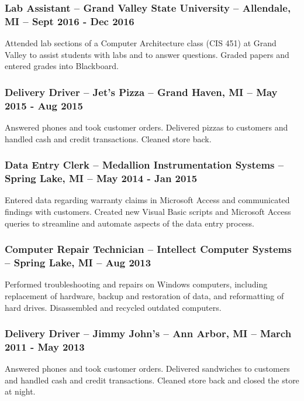 \documentclass{article}
\begin{document}
		\subsubsection{Lab Assistant -- Grand Valley State University -- Allendale, MI -- Sept 2016 - Dec 2016}
			\begin{addmargin}[1em]{0em}
				Attended lab sections of a Computer Architecture class (CIS 451) at Grand Valley to assist students with labs and to answer questions. Graded papers and entered grades into Blackboard.
			\end{addmargin}

		\subsubsection{Delivery Driver -- Jet’s Pizza -- Grand Haven, MI -- May 2015 - Aug 2015}
			\begin{addmargin}[1em]{0em}
				Answered phones and took customer orders. Delivered pizzas to customers and handled cash and credit transactions. Cleaned store back.
			\end{addmargin}

		\subsubsection{Data Entry Clerk -- Medallion Instrumentation Systems -- Spring Lake, MI -- May 2014 - Jan 2015}
			\begin{addmargin}[1em]{0em}
				Entered data regarding warranty claims in Microsoft Access and communicated findings with customers. Created new Visual Basic scripts and Microsoft Access queries to streamline and automate aspects of the data entry process.
			\end{addmargin}

		\subsubsection{Computer Repair Technician -- Intellect Computer Systems -- Spring Lake, MI -- Aug 2013}
			\begin{addmargin}[1em]{0em}
				Performed troubleshooting and repairs on Windows computers, including replacement of hardware, backup and restoration of data, and reformatting of hard drives. Disassembled and recycled outdated computers.
			\end{addmargin}

		\subsubsection{Delivery Driver -- Jimmy John's -- Ann Arbor, MI -- March 2011 - May 2013}
			\begin{addmargin}[1em]{0em}
				Answered phones and took customer orders. Delivered sandwiches to customers and handled cash and credit transactions. Cleaned store back and closed the store at night.
			\end{addmargin}
\end{document}
